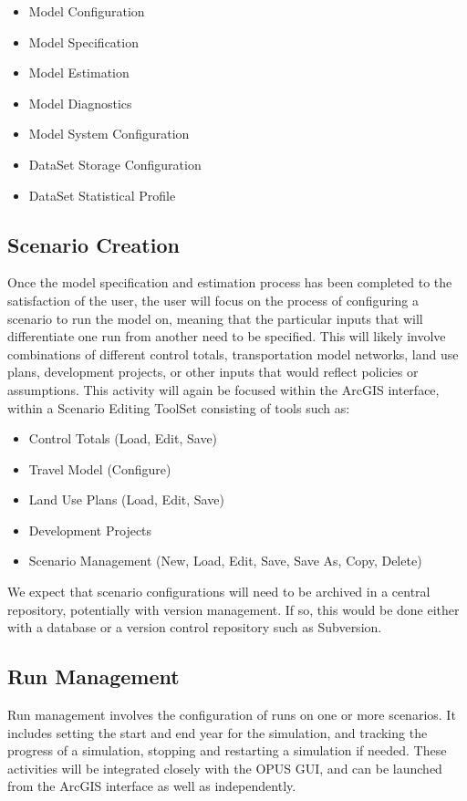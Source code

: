 \begin{itemize}
\item Model Configuration
\item Model Specification
\item Model Estimation
\item Model Diagnostics
\item Model System Configuration
\item DataSet Storage Configuration
\item DataSet Statistical Profile
\end{itemize}

\subsection{Scenario Creation}
Once the model specification and estimation process has been completed to the satisfaction of the user, the user will focus on the process of configuring a scenario to run the model on, meaning that the particular inputs that will differentiate one run from another need to be specified.  This will likely involve combinations of different control totals, transportation model networks, land use plans, development projects, or other inputs that would reflect policies or assumptions.  This activity will again be focused within the ArcGIS interface, within a Scenario Editing ToolSet consisting of tools such as:

\begin{itemize}
\item Control Totals (Load, Edit, Save)
\item Travel Model (Configure)
\item Land Use Plans (Load, Edit, Save)
\item Development Projects
\item Scenario Management (New, Load, Edit, Save, Save As, Copy, Delete)
\end{itemize}

We expect that scenario configurations will need to be archived in a central repository, potentially with version management.  If so, this would be done either with a database or a version control repository such as Subversion.


\subsection{Run Management}
Run management involves the configuration of runs on one or more scenarios.  It includes setting the start and end year for the simulation, and tracking the progress of a simulation, stopping and restarting a simulation if needed.  These activities will be integrated closely with the OPUS GUI, and can be launched from the ArcGIS interface as well as independently.

